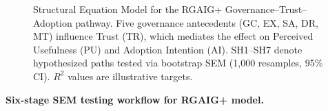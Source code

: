 \begin{figure}[!htbp]
{%
}%
\caption[SEM Structural Model: Governance → Trust → Adoption]{Structural Equation Model for the RGAIG+ Governance--Trust--Adoption pathway. Five governance antecedents (GC, EX, SA, DR, MT) influence Trust (TR), which mediates the effect on Perceived Usefulness (PU) and Adoption Intention (AI). SH1--SH7 denote hypothesized paths tested via bootstrap SEM (1,000 resamples, 95\% CI). $R^2$ values are illustrative targets.}
\label{fig:rgaig_sem_model}
\end{figure}

\noindent\textbf{Six-stage SEM testing workflow for RGAIG+ model.}

